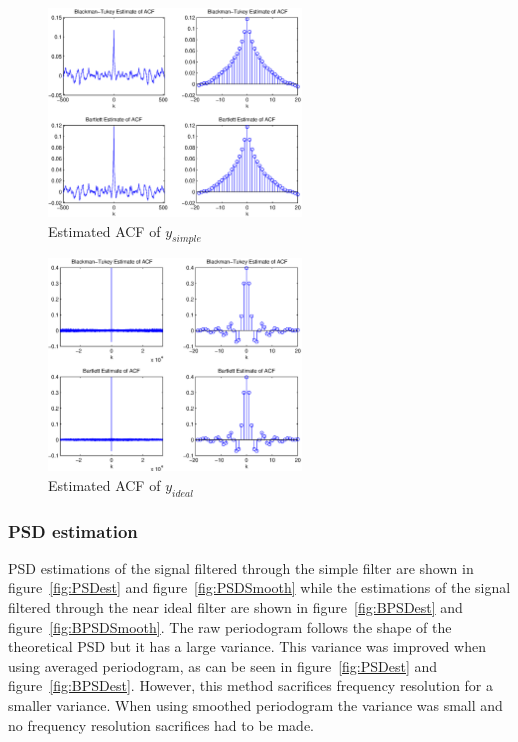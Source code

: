 \documentclass[10pt]{article}
\begin{document}
\begin{figure}[!hp]

    \begin{center}
      \includegraphics[width=0.6\textwidth]{EstACF}
    \caption{Estimated ACF of $y_{simple}$ \label{fig:ACFest}}
    \end{center}

\end{figure}

\begin{figure}[!hp]

    \begin{center}
      \includegraphics[width=0.6\textwidth]{BEstACF}
    \caption{Estimated ACF of $y_{ideal}$ \label{fig:BACFest}}
    \end{center}

\end{figure}

\clearpage

\subsubsection{PSD estimation}


PSD estimations of the signal filtered through the simple filter are
shown in figure~\ref{fig:PSDest} and figure~\ref{fig:PSDSmooth} while the estimations of the signal
filtered through the near ideal filter are shown in figure~\ref{fig:BPSDest} and
figure~\ref{fig:BPSDSmooth}. The raw periodogram follows the shape of the theoretical
PSD but it has a large variance. This variance was improved when using averaged periodogram,
 as can be seen in figure~\ref{fig:PSDest} and figure~\ref{fig:BPSDest}.
 However, this method sacrifices frequency resolution for a smaller variance.
 When using smoothed periodogram the variance was small and no frequency
 resolution sacrifices had to be made.
\end{document}
